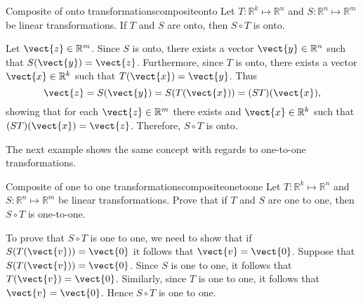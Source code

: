 \begin{example}{Composite of onto transformations}{compositeonto}
Let $T: \mathbb{R}^k \mapsto \mathbb{R}^n$ and $S: \mathbb{R}^n \mapsto \mathbb{R}^m$ be linear transformations. 
If $T$ and $S$ are onto, then $S \circ T$ is onto.
\end{example}

\begin{solution}
Let $\vect{z}\in \mathbb{R}^m$.  
Since $S$ is onto, there exists a vector $\vect{y}\in \mathbb{R}^n$
such that $S(\vect{y})=\vect{z}$.
Furthermore, since $T$ is onto, there exists a vector $\vect{x}\in \mathbb{R}^k$
such that $T(\vect{x})=\vect{y}$.
Thus
\[ \vect{z} = S(\vect{y}) = S(T(\vect{x})) = (ST)(\vect{x}),\]
showing that for each $\vect{z}\in \mathbb{R}^m$ there exists and $\vect{x}\in \mathbb{R}^k$
such that $(ST)(\vect{x})=\vect{z}$.
Therefore, $S \circ T$ is onto.
\end{solution}

The next example shows the same concept with regards to one-to-one transformations. 

\begin{example}{Composite of one to one transformations}{compositeonetoone}
Let $T: \mathbb{R}^k \mapsto \mathbb{R}^n$ and $S: \mathbb{R}^n \mapsto \mathbb{R}^m$ be linear transformations. 
Prove that if $T$ and $S$ are one to one, then $S \circ T$ 
is one-to-one.
\end{example}

\begin{solution}
To prove that $S \circ T$ is one to one, we need to show that if $S(T (\vect{v})) = \vect{0}$ it follows that $\vect{v} = \vect{0}$. 
Suppose that  $S(T (\vect{v})) = \vect{0}$. Since $S$ is one to one, it follows that  $T (\vect{v}) = \vect{0}$. Similarly, since $T$ is one to one, it follows that $\vect{v} = \vect{0}$. Hence $S \circ T$ is one to one. 
\end{solution}
